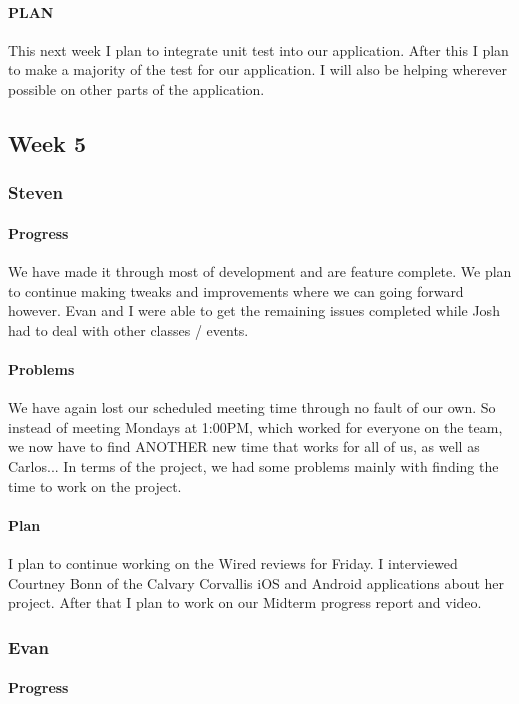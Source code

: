 \documentclass[onecolumn, draftclsnofoot,10pt, compsoc]{IEEEtran}
\begin{document}
	\paragraph{PLAN}
	This next week I plan to integrate unit test into our application. After this I plan to make a majority of the test for our application. I will also be helping wherever possible on other parts of the application.
\subsection{Week 5}
	\subsubsection{Steven}
	\paragraph{Progress}
	We have made it through most of development and are feature complete. We plan to continue making tweaks and improvements where we can going forward however. Evan and I were able to get the remaining issues completed while Josh had to deal with other classes / events.
	
	\paragraph{Problems}
	We have again lost our scheduled meeting time through no fault of our own. So instead of meeting Mondays at 1:00PM, which worked for everyone on the team, we now have to find ANOTHER new time that works for all of us, as well as Carlos... In terms of the project, we had some problems mainly with finding the time to work on the project.
	
	\paragraph{Plan}
	I plan to continue working on the Wired reviews for Friday. I interviewed Courtney Bonn of the Calvary Corvallis iOS and Android applications about her project. After that I plan to work on our Midterm progress report and video. 
	
	
	\subsubsection{Evan}
	
	\paragraph{Progress}
	
\end{document}

